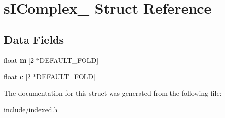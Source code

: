 \hypertarget{structs_i_complex__}{}\section{s\+I\+Complex\+\_\+ Struct Reference}
\label{structs_i_complex__}
\subsection*{Data Fields}
\begin{DoxyCompactItemize}
\item 
\hypertarget{structs_i_complex___a86ec41d776b9af161ce6c59d9d00c516}{}float {\bfseries m} \mbox{[}2 $\ast$D\+E\+F\+A\+U\+L\+T\+\_\+\+F\+O\+L\+D\mbox{]}\label{structs_i_complex___a86ec41d776b9af161ce6c59d9d00c516}

\item 
\hypertarget{structs_i_complex___aad08505eaad95a0c777c92905b0401dd}{}float {\bfseries c} \mbox{[}2 $\ast$D\+E\+F\+A\+U\+L\+T\+\_\+\+F\+O\+L\+D\mbox{]}\label{structs_i_complex___aad08505eaad95a0c777c92905b0401dd}

\end{DoxyCompactItemize}


The documentation for this struct was generated from the following file\+:\begin{DoxyCompactItemize}
\item 
include/\hyperlink{indexed_8h}{indexed.\+h}\end{DoxyCompactItemize}
